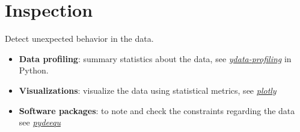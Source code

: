 \section{Inspection}
Detect unexpected behavior in the data.
\begin{itemize}
    \item \textbf{Data profiling}: summary statistics about the data, see \href{https://github.com/ydataai/ydata-profiling}{\textit{ydata-profiling}} in Python.
    \item \textbf{Visualizations}: visualize the data using statistical metrics, see
        \href{https://plotly.com/python/}{\textit{plotly}}
    \item \textbf{Software packages}: to note and check the constraints regarding the data
        see \href{https://pypi.org/project/pydeequ/}{\textit{pydeequ}}
\end{itemize}

